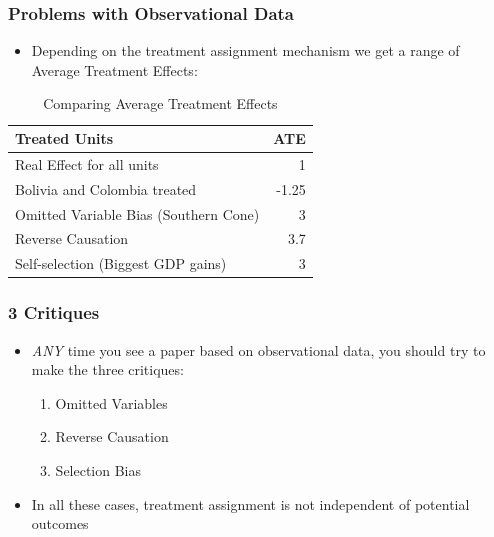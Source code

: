 \documentclass[xcolor=x11names,compress]{beamer}\usepackage[]{graphicx}\usepackage[]{color}
\renewcommand{\(}{\begin{columns}}
\renewcommand{\)}{\end{columns}}
\newcommand{\<}[1]{\begin{column}{#1}}
\renewcommand{\>}{\end{column}}
\begin{document}




\begin{frame}
\frametitle{Problems with Observational Data}
\begin{itemize}
\item Depending on the treatment assignment mechanism we get a range of Average Treatment Effects:
\end{itemize}
\begin{table}[htbp]
  \centering
  \caption{Comparing Average Treatment Effects}
    \begin{tabular}{|l|r|}
    \hline
    \textbf{Treated Units} & \multicolumn{1}{l|}{\textbf{ATE}} \bigstrut\\
    \hline
    Real Effect for all units & 1 \bigstrut\\
    \hline
    Bolivia and Colombia treated & -1.25 \bigstrut\\
    \hline
    Omitted Variable Bias (Southern Cone) & 3 \bigstrut\\
    \hline
    Reverse Causation & 3.7 \bigstrut\\
    \hline
    Self-selection (Biggest GDP gains) & 3 \bigstrut\\
    \hline
    \end{tabular}%
\end{table}%
\end{frame}

\begin{frame}
\frametitle{3 Critiques}
\begin{itemize}
\item \textit{ANY} time you see a paper based on observational data, you should try to make the three critiques:
\pause
\begin{enumerate}
\item Omitted Variables
\item Reverse Causation
\item Selection Bias
\end{enumerate}
\item In all these cases, treatment assignment is not independent of potential outcomes
\end{itemize}
\end{frame}
\end{document}
